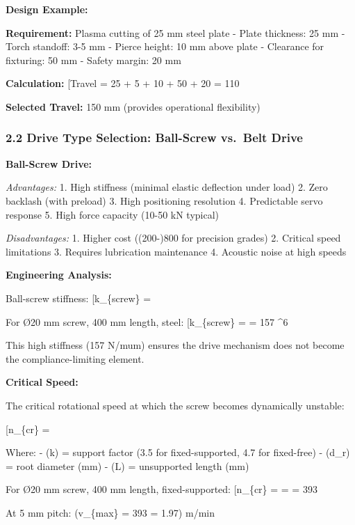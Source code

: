 \documentclass[
]{article}
\begin{document}
\textbf{Design Example:}

\textbf{Requirement:} Plasma cutting of 25 mm steel plate - Plate
thickness: 25 mm - Torch standoff: 3-5 mm - Pierce height: 10 mm above
plate - Clearance for fixturing: 50 mm - Safety margin: 20 mm

\textbf{Calculation:} {[}Travel = 25 + 5 + 10 + 50 + 20 = 110
\text{ mm minimum}{]}

\textbf{Selected Travel:} 150 mm (provides operational flexibility)

\subsubsection{2.2 Drive Type Selection: Ball-Screw vs.~Belt
Drive}\label{drive-type-selection-ball-screw-vs.-belt-drive}

\textbf{Ball-Screw Drive:}

\emph{Advantages:} 1. High stiffness (minimal elastic deflection under
load) 2. Zero backlash (with preload) 3. High positioning resolution 4.
Predictable servo response 5. High force capacity (10-50 kN typical)

\emph{Disadvantages:} 1. Higher cost ((200-)800 for precision grades) 2.
Critical speed limitations 3. Requires lubrication maintenance 4.
Acoustic noise at high speeds

\textbf{Engineering Analysis:}

Ball-screw stiffness: {[}k\_\{screw\} = \frac{EA}{L}{]}

For Ø20 mm screw, 400 mm length, steel: {[}k\_\{screw\} =
 = 157
\^{}6 \text{ N/m}{]}

This high stiffness (157 N/mum) ensures the drive mechanism does not
become the compliance-limiting element.

\textbf{Critical Speed:}

The critical rotational speed at which the screw becomes dynamically
unstable:

{[}n\_\{cr\} = \frac{k \times 10^6 \times d_r}{L^2}{]}

Where: - (k) = support factor (3.5 for fixed-supported, 4.7 for
fixed-free) - (d\_r) = root diameter (mm) - (L) = unsupported length
(mm)

For Ø20 mm screw, 400 mm length, fixed-supported: {[}n\_\{cr\} =
 = 
= 393 \text{ rpm}{]}

At 5 mm pitch: (v\_\{max\} = 393  = 1.97) m/min
\end{document}
